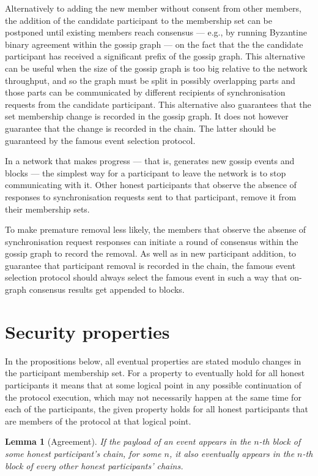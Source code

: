 \documentclass[a4paper,11pt]{article}
\newtheorem{lemma}[theorem]{Lemma}
\begin{document}
Alternatively to adding the new member without consent from other members, the addition of the
candidate participant to the membership set can be postponed until existing members reach consensus
--- e.g., by running Byzantine binary agreement within the gossip graph --- on the fact that the the
candidate participant has received a significant prefix of the gossip graph. This alternative can be
useful when the size of the gossip graph is too big relative to the network throughput, and so the
graph must be split in possibly overlapping parts and those parts can be communicated by different
recipients of synchronisation requests from the candidate participant. This alternative also
guarantees that the set membership change is recorded in the gossip graph. It does not however
guarantee that the change is recorded in the chain. The latter should be guaranteed by the famous
event selection protocol.

In a network that makes progress --- that is, generates new gossip events and blocks --- the
simplest way for a participant to leave the network is to stop communicating with it. Other honest
participants that observe the absence of responses to synchronisation requests sent to that
participant, remove it from their membership sets.

To make premature removal less likely, the members that observe the absense of synchronisation
request responses can initiate a round of consensus within the gossip graph to record the
removal. As well as in new participant addition, to guarantee that participant removal is recorded
in the chain, the famous event selection protocol should always select the famous event in such a
way that on-graph consensus results get appended to blocks.


\section{Security properties}\label{sec:security}

In the propositions below, all eventual properties are stated modulo changes in the participant
membership set. For a property to eventually hold for all honest participants it means that at some
logical point in any possible continuation of the protocol execution, which may not necessarily
happen at the same time for each of the participants, the given property holds for all honest
participants that are members of the protocol at that logical point.

\begin{lemma}[Agreement]\label{lem:agreement}
  If the payload of an event appears in the $n$-th block of some honest participant's chain, for
  some $n$, it also eventually appears in the $n$-th block of every other honest participants'
  chains.
\end{lemma}
\end{document}
